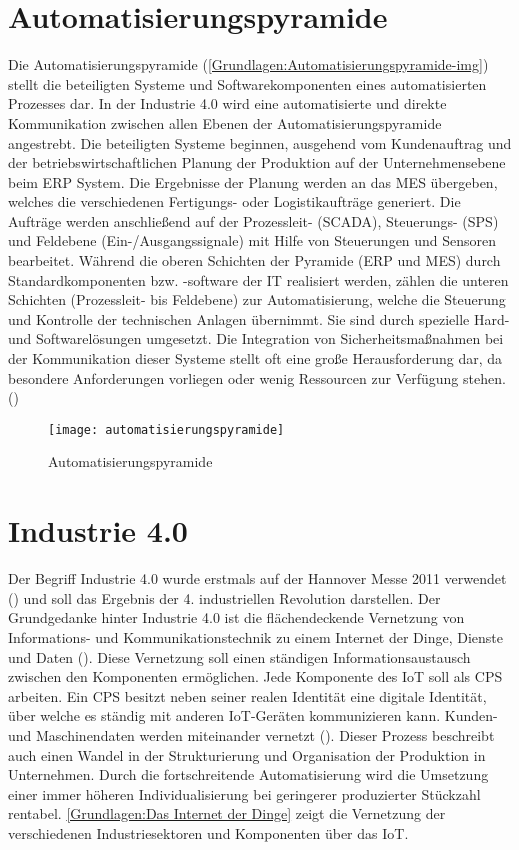 \clearpage

\section{Automatisierungspyramide}
\label{Grundlagen:Automatisierungspyramide}
Die Automatisierungspyramide (\autoref{Grundlagen:Automatisierungspyramide-img}) stellt die beteiligten Systeme und Softwarekomponenten eines automatisierten Prozesses dar. In der Industrie 4.0 wird eine automatisierte und direkte Kommunikation zwischen allen Ebenen der Automatisierungspyramide angestrebt. Die beteiligten Systeme beginnen, ausgehend vom Kundenauftrag und der betriebswirtschaftlichen Planung der Produktion auf der Unternehmensebene beim \ac{ERP} System. Die Ergebnisse der Planung werden an das \ac{MES} übergeben, welches die verschiedenen Fertigungs- oder Logistikaufträge generiert. Die Aufträge werden anschließend auf der Prozessleit- (\ac{SCADA}), Steuerungs- (\ac{SPS}) und Feldebene (Ein-/Ausgangssignale) mit Hilfe von Steuerungen und Sensoren bearbeitet. Während die oberen Schichten der Pyramide (\ac{ERP} und \ac{MES}) durch Standardkomponenten bzw. -software der IT realisiert werden, zählen die unteren Schichten (Prozessleit- bis Feldebene) zur Automatisierung, welche die Steuerung und Kontrolle der technischen Anlagen übernimmt. Sie sind durch spezielle Hard- und Softwarelösungen umgesetzt. Die Integration von Sicherheitsmaßnahmen bei der Kommunikation dieser Systeme stellt oft eine große Herausforderung dar, da besondere Anforderungen vorliegen oder wenig Ressourcen zur Verfügung stehen. (\cite{Sander2014})

\begin{figure}[h]
  \centering
  \texttt{[image: automatisierungspyramide]}
  \caption{Automatisierungspyramide}
  \label{Grundlagen:Automatisierungspyramide-img}
\end{figure}

\section{Industrie 4.0}
Der Begriff Industrie 4.0 wurde erstmals auf der Hannover Messe 2011 verwendet (\cite{drath2014}) und soll das Ergebnis der 4. industriellen Revolution darstellen. Der Grundgedanke hinter Industrie 4.0 ist die flächendeckende Vernetzung von Informations- und Kommunikationstechnik zu einem Internet der Dinge, Dienste und Daten (\cite{spath2013}). Diese Vernetzung soll einen ständigen Informationsaustausch zwischen den Komponenten ermöglichen. Jede Komponente des \ac{IoT} soll als \ac{CPS} arbeiten. Ein \ac{CPS} besitzt neben seiner realen Identität eine digitale Identität, über welche es ständig mit anderen \ac{IoT}-Geräten kommunizieren kann. Kunden- und Maschinendaten werden miteinander vernetzt (\cite{rami2016}). Dieser Prozess beschreibt auch einen Wandel in der Strukturierung und Organisation der Produktion in Unternehmen. Durch die fortschreitende Automatisierung wird die Umsetzung einer immer höheren Individualisierung bei geringerer produzierter Stückzahl rentabel. \autoref{Grundlagen:Das Internet der Dinge} zeigt die Vernetzung der verschiedenen Industriesektoren und Komponenten über das \ac{IoT}.

